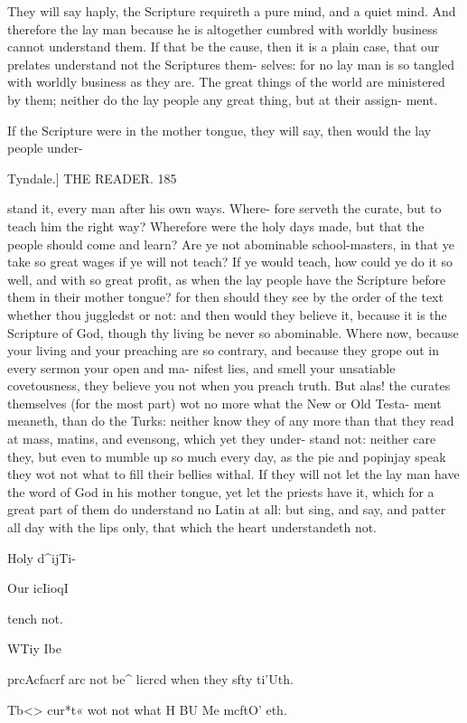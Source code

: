 \documentclass{custom}
\begin{document}
They will say haply, the Scripture requireth a 
pure mind, and a quiet mind. And therefore 
the lay man because he is altogether cumbred 
with worldly business cannot understand them. 
If that be the cause, then it is a plain case, that 
our prelates understand not the Scriptures them- 
selves: for no lay man is so tangled with worldly 
business as they are. The great things of the 
world are ministered by them; neither do the 
lay people any great thing, but at their assign- 
ment.

If the Scripture were in the mother tongue,
they will say, then would the lay people under-


Tyndale.] 
THE READER. 
185

stand it, every man after his own ways. Where- 
fore serveth the curate, but to teach him the 
right way? Wherefore were the holy days 
made, but that the people should come and learn? 
Are ye not abominable school-masters, in that ye 
take so great wages if ye will not teach? If ye 
would teach, how could ye do it so well, and 
with so great profit, as when the lay people have 
the Scripture before them in their mother tongue?
for then should they see by the order of the text 
whether thou juggledst or not: and then would 
they believe it, because it is the Scripture of God, 
though thy living be never so abominable.
Where now, because your living and your 
preaching are so contrary, and because they 
grope out in every sermon your open and ma- 
nifest lies, and smell your unsatiable covetousness,
they believe you not when you preach truth. 
But alas! the curates themselves (for the most 
part) wot no more what the New or Old Testa- 
ment meaneth, than do the Turks: neither know 
they of any more than that they read at mass, 
matins, and evensong, which yet they under- 
stand not: neither care they, but even to mumble 
up so much every day, as the pie and popinjay 
speak they wot not what to fill their bellies 
withal. If they will not let the lay man have 
the word of God in his mother tongue, yet let 
the priests have it, which for a great part of them 
do understand no Latin at all: but sing, and say, 
and patter all day with the lips only, that which 
the heart understandeth not. 

Holy d^ijTi- 

Our icIioqI 

tench not. 

WTiy Ibe 

prcAcfacrf 
arc not be^ 
licrcd when 
they sfty 
ti'Uth. 

Tb<> cur*t« 
wot not 
what H BU 
Me mcftO' 
eth. 
\end{document}
